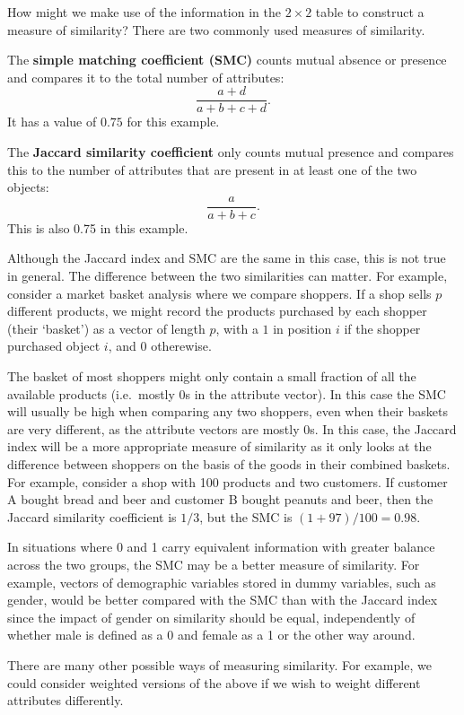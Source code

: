 \documentclass[]{book}
\theoremstyle{definition}
\theoremstyle{definition}
\theoremstyle{definition}
\theoremstyle{remark}
\begin{document}
How might we make use of the information in the \(2 \times 2\) table to construct a measure of similarity? There are two commonly used measures of similarity.

The \textbf{simple matching coefficient (SMC)} counts mutual absence or presence and compares it to the total number of attributes:
\begin{equation}
\frac{a+d}{a+b+c+d}.
\label{eq:smc}
\end{equation}
It has a value of \(0.75\) for this example.

The \textbf{Jaccard similarity coefficient} only counts mutual presence and compares this to the number of attributes that are present in at least one of the two objects:
\[
\frac{a}{a+b+c}.
\]
This is also 0.75 in this example.

Although the Jaccard index and SMC are the same in this case, this is not true in general.
The difference between the two similarities can matter. For example, consider a market basket analysis where we compare shoppers. If a shop sells \(p\) different products, we might record the products purchased by each shopper (their `basket') as a vector of length \(p\), with a \(1\) in position \(i\) if the shopper purchased object \(i\), and \(0\) otherewise.

The basket of most shoppers might only contain a small fraction of all the available products (i.e.~mostly 0s in the attribute vector). In this case the SMC will usually be high when comparing any two shoppers, even when their baskets are very different, as the attribute vectors are mostly \(0\)s. In this case, the Jaccard index will be a more appropriate measure of similarity as it only looks at the difference between shoppers on the basis of the goods in their combined baskets. For example, consider a shop with 100 products and two customers.
If customer A bought bread and beer and customer B bought peanuts and beer, then the Jaccard similarity coefficient is \(1/3\), but the SMC is \((1+97)/100=0.98\).

In situations where 0 and 1 carry equivalent information with greater balance across the two groups, the SMC may be a better measure of similarity. For example, vectors of demographic variables stored in dummy variables, such as gender, would be better compared with the SMC than with the Jaccard index since the impact of gender on similarity should be equal, independently of whether male is defined as a 0 and female as a 1 or the other way around.

There are many other possible ways of measuring similarity. For example, we could consider weighted versions of the above if we wish to weight different attributes differently.
\end{document}
